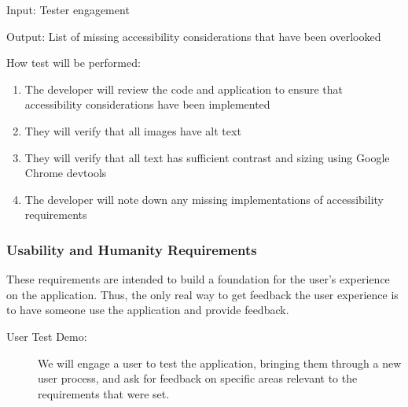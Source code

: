 \documentclass[12pt, titlepage]{article}
\begin{document}
\begin{enumerate}
Input: Tester engagement
					
Output: List of missing accessibility considerations that have been overlooked
					
How test will be performed: 
\begin{enumerate}
  \item The developer will review the code and application to ensure that accessibility considerations have been implemented
  \item They will verify that all images have alt text
  \item They will verify that all text has sufficient contrast and sizing using Google Chrome devtools
  \item The developer will note down any missing implementations of accessibility requirements
\end{enumerate}

\end{enumerate}

\subsubsection{Usability and Humanity Requirements}
These requirements are intended to build a foundation for the user's experience
on the application. Thus, the only real way to get feedback the user experience
is to have someone use the application and provide feedback.

\begin{description}
  \item[User Test Demo:] We will engage a user to test the application, bringing
  them through a new user process, and ask for feedback on specific areas
  relevant to the requirements that were set.
\end{description}
\end{document}
